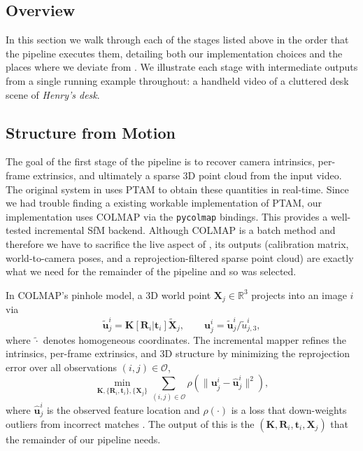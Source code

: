 \documentclass[10pt,twocolumn]{article}
\begin{document}
\subsection{Overview}

In this section we walk through each of the stages listed above in the order that the pipeline executes them, detailing both our implementation choices and the places where we deviate from \cite{newcombe2010}. We illustrate each stage with intermediate outputs from a single running example throughout: a handheld video of a cluttered desk scene of \textit{Henry's desk}.

\subsection{Structure from Motion}

The goal of the first stage of the pipeline is to recover camera intrinsics, per-frame extrinsics, and ultimately a sparse 3D point cloud from the input video.
The original system in \cite{newcombe2010} uses PTAM \cite{PTAM} to obtain these quantities in real-time. Since we had trouble finding a existing workable implementation of PTAM, our implementation uses COLMAP \cite{COLMAP} via the \texttt{pycolmap} bindings. This provides a well-tested incremental SfM backend. Although COLMAP is a batch method and therefore we have to sacrifice the live aspect of \cite{newcombe2010}, its outputs (calibration matrix, world-to-camera poses, and a reprojection-filtered sparse point cloud) are exactly what we need for the remainder of the pipeline and so was selected.

In COLMAP's pinhole model, a 3D world point $\mathbf{X}_j \in \mathbb{R}^3$ projects into an image $i$ via
\begin{equation}
    \tilde{\mathbf{u}}^i_j = \mathbf{K} [\mathbf{R}_i | \mathbf{t}_i] \tilde{\mathbf{X}}_j, \qquad \mathbf{u}^i_j = \tilde{\mathbf{u}}^i_j / \tilde{u}^i_{j,3},
\end{equation}
where $\tilde{\cdot}$ denotes homogeneous coordinates. The incremental mapper \cite{COLMAP} refines the intrinsics, per-frame extrinsics, and 3D structure by minimizing the reprojection error over all observations $(i, j) \in \mathcal{O}$,
\begin{equation}
    \min_{\mathbf{K}, \{\mathbf{R}_i,\mathbf{t}_i\}, \{\mathbf{X}_j\}} \sum_{(i,j)\in\mathcal{O}} \rho( \| \mathbf{u}^i_j - \hat{\mathbf{u}}^i_j \|^2 ),
\end{equation}
where $\hat{\mathbf{u}}^i_j$ is the observed feature location and $\rho(\cdot)$ is a loss that down-weights outliers from incorrect matches \cite{COLMAP}. The output of this is the $(\mathbf{K}, \mathbf{R}_i, \mathbf{t}_i, \mathbf{X}_j)$ that the remainder of our pipeline needs.
\end{document}
